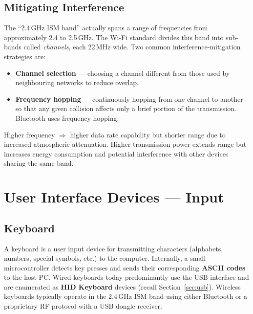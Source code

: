 \documentclass[11pt, a4paper, notitlepage]{report}
\theoremstyle{definition}
\theoremstyle{remark}
\theoremstyle{definition}
\begin{document}
\subsection{Mitigating Interference}
\label{sec:interference}

The ``2.4\,GHz ISM band'' actually spans a range of frequencies from approximately 2.4 to 2.5\,GHz. The Wi-Fi standard divides this band into sub-bands called \emph{channels}, each 22\,MHz wide. Two common interference-mitigation strategies are:

\begin{itemize}
  \item \textbf{Channel selection} --- choosing a channel different from those used by neighbouring networks to reduce overlap.
  \item \textbf{Frequency hopping} --- continuously hopping from one channel to another so that any given collision affects only a brief portion of the transmission. Bluetooth uses frequency hopping.
\end{itemize}

\begin{keyresult}[title={Key Result: Wireless Range Trade-offs}]
  Higher frequency $\Rightarrow$ higher data rate capability but shorter range due to increased atmospheric attenuation. Higher transmission power extends range but increases energy consumption and potential interference with other devices sharing the same band.
\end{keyresult}


\section{User Interface Devices --- Input}
\label{sec:ui-input}

\subsection{Keyboard}
\label{sec:keyboard}

A keyboard is a user input device for transmitting characters (alphabets, numbers, special symbols, etc.) to the computer. Internally, a small microcontroller detects key presses and sends their corresponding \textbf{ASCII codes} to the host PC. Wired keyboards today predominantly use the USB interface and are enumerated as \textbf{HID Keyboard} devices (recall Section~\ref{sec:usb}). Wireless keyboards typically operate in the 2.4\,GHz ISM band using either Bluetooth or a proprietary RF protocol with a USB dongle receiver.
\end{document}
